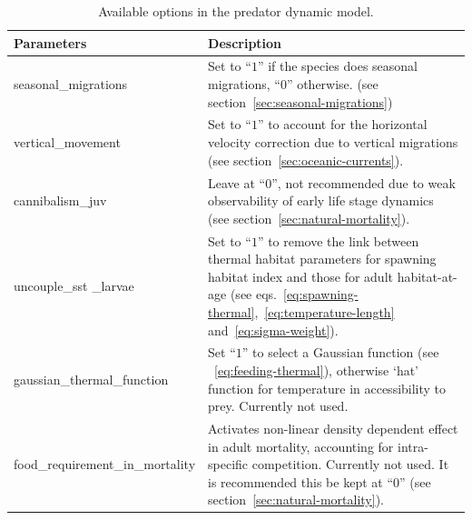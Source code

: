 \begin{table}[H]
\caption{Available options in the predator dynamic model.}
\begin{tabular}{p{6cm}p{9.5cm}}
    \hline
    {\bfseries Parameters} &  {\bfseries Description}\\ \hline\hline
    {\ttfamily seasonal\_migrations} & Set to ``$1$'' if  the species does seasonal migrations, ``$0$'' otherwise. (see section~\ref{sec:seasonal-migrations}) \\\hline
    {\ttfamily vertical\_movement } & Set to ``$1$'' to account for the horizontal velocity correction due to vertical migrations (see section~\ref{sec:oceanic-currents}). \\\hline
    {\ttfamily cannibalism\_juv} &  Leave at ``$0$'', not recommended due to weak observability of early life stage dynamics (see section~\ref{sec:natural-mortality}). \\\hline
    {\ttfamily uncouple\_sst}  {\ttfamily \_larvae} &  Set to ``$1$'' to remove the link between thermal habitat parameters for spawning habitat index and those for adult habitat-at-age (see eqs.~\eqref{eq:spawning-thermal},~\eqref{eq:temperature-length} and~\eqref{eq:sigma-weight}).\\\hline
    {\ttfamily gaussian\_thermal\_function} & Set ``$1$'' to select a Gaussian function (see ~\eqref{eq:feeding-thermal}), otherwise ‘hat’ function for temperature in accessibility to prey. Currently not used. \\\hline
    {\ttfamily food\_requirement\_in\_mortality} & Activates non-linear density dependent effect in adult mortality, accounting for intra-specific competition. Currently not used. It is recommended this be kept at ``$0$'' (see section~\ref{sec:natural-mortality}). \\\hline
\hline
\end{tabular}
\label{tab:options_predator_model}
\end{table}


